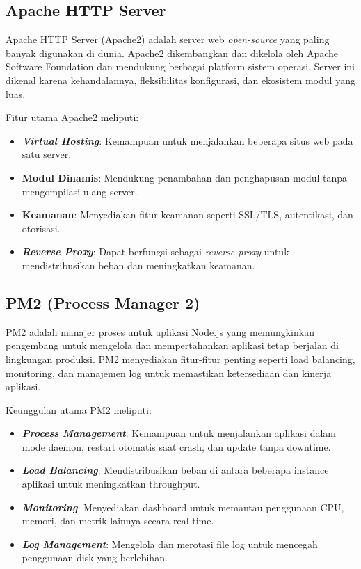 \subsection{Apache HTTP Server}

Apache HTTP Server (Apache2) adalah server web \emph{open-source} yang paling banyak digunakan di dunia. Apache2 dikembangkan dan dikelola oleh Apache Software Foundation dan mendukung berbagai platform sistem operasi. Server ini dikenal karena kehandalannya, fleksibilitas konfigurasi, dan ekosistem modul yang luas. \parencite*{apache2024}

Fitur utama Apache2 meliputi:
\begin{itemize}[nolistsep]
  \item \textbf{\emph{Virtual Hosting}}: Kemampuan untuk menjalankan beberapa situs web pada satu server.
  \item \textbf{Modul Dinamis}: Mendukung penambahan dan penghapusan modul tanpa mengompilasi ulang server.
  \item \textbf{Keamanan}: Menyediakan fitur keamanan seperti SSL/TLS, autentikasi, dan otorisasi.
  \item \textbf{\emph{Reverse Proxy}}: Dapat berfungsi sebagai \emph{reverse proxy} untuk mendistribusikan beban dan meningkatkan keamanan.
\end{itemize}

\subsection{PM2 (Process Manager 2)}

PM2 adalah manajer proses untuk aplikasi Node.js yang memungkinkan pengembang untuk mengelola dan mempertahankan aplikasi tetap berjalan di lingkungan produksi. PM2 menyediakan fitur-fitur penting seperti load balancing, monitoring, dan manajemen log untuk memastikan ketersediaan dan kinerja aplikasi. \parencite*{pm22024}

Keunggulan utama PM2 meliputi:
\begin{itemize}[nolistsep]
  \item \textbf{\emph{Process Management}}: Kemampuan untuk menjalankan aplikasi dalam mode daemon, restart otomatis saat crash, dan update tanpa downtime.
  \item \textbf{\emph{Load Balancing}}: Mendistribusikan beban di antara beberapa instance aplikasi untuk meningkatkan throughput.
  \item \textbf{\emph{Monitoring}}: Menyediakan dashboard untuk memantau penggunaan CPU, memori, dan metrik lainnya secara real-time.
  \item \textbf{\emph{Log Management}}: Mengelola dan merotasi file log untuk mencegah penggunaan disk yang berlebihan.
\end{itemize}
